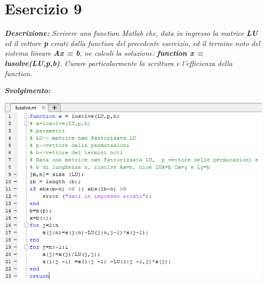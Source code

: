 \section{Esercizio 9}
\textit{\textbf{Descrizione:} Scrivere una function Matlab che, data in ingresso la matrice \textbf{LU} ed il vettore \textbf{p} creati dalla function del precedente esercizio, ed il termine noto del sistema lineare \textbf{Ax = b}, ne calcoli la soluzione: \textbf{function x = lusolve(LU,p,b)}. Curare particolarmente la scrittura e l'efficienza della function.}\newline

\noindent \textit{\textbf{Svolgimento:}}\newline

\includegraphics[width=1.3\linewidth]{img/lusolve.png}\newpage